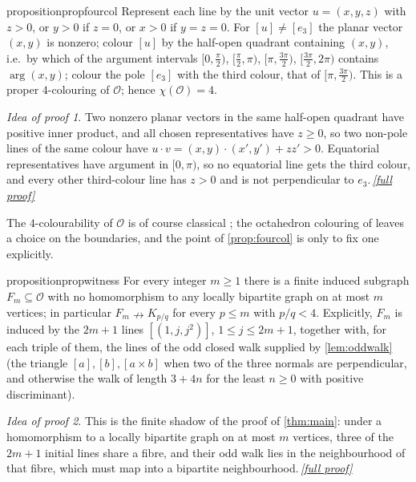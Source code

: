 \documentclass[11pt,a4paper]{article}
\theoremstyle{plain}
\theoremstyle{definition}
\theoremstyle{remark}
\newtheorem*{proofidea}{Idea of proof}
\newcommand{\fullproofref}[1]{\,\hyperref[#1]{\textit{[full proof]}}}
\newcommand{\cO}{\mathcal O}
\newcommand{\Kc}[2]{K_{#1/#2}}
\newcommand{\Fin}[1]{F_{#1}}
\begin{document}
\begin{restatable}{proposition}{propfourcol}\label{prop:fourcol}
Represent each line by the unit vector $u=(x,y,z)$ with $z>0$, or $y>0$ if $z=0$, or $x>0$ if $y=z=0$. For $[u]\ne[e_3]$ the planar vector $(x,y)$ is nonzero; colour $[u]$ by the half-open quadrant containing $(x,y)$, i.e.\ by which of the argument intervals $[0,\tfrac\pi2)$, $[\tfrac\pi2,\pi)$, $[\pi,\tfrac{3\pi}2)$, $[\tfrac{3\pi}2,2\pi)$ contains $\arg(x,y)$; colour the pole $[e_3]$ with the third colour, that of $[\pi,\tfrac{3\pi}2)$. This is a proper $4$-colouring of $\cO$; hence $\chi(\cO)=4$.
\end{restatable}
\begin{proofidea}
Two nonzero planar vectors in the same half-open quadrant have positive inner product, and all chosen representatives have $z\ge0$, so two non-pole lines of the same colour have $u\cdot v=(x,y)\cdot(x',y')+zz'>0$. Equatorial representatives have argument in $[0,\pi)$, so no equatorial line gets the third colour, and every other third-colour line has $z>0$ and is not perpendicular to $e_3$.\fullproofref{pf:fourcol}
\end{proofidea}
The $4$-colourability of $\cO$ is of course classical \cite{GZ88,Ghebleh07,OPG}; the octahedron colouring of \cite{OPG} leaves a choice on the boundaries, and the point of \cref{prop:fourcol} is only to fix one explicitly.

\begin{restatable}{proposition}{propwitness}\label{prop:witness}
For every integer $m\ge1$ there is a finite induced subgraph $\Fin m\subseteq\cO$ with no homomorphism to any locally bipartite graph on at most $m$ vertices; in particular $\Fin m\nrightarrow\Kc pq$ for every $p\le m$ with $p/q<4$. Explicitly, $\Fin m$ is induced by the $2m+1$ lines $[(1,j,j^2)]$, $1\le j\le 2m+1$, together with, for each triple of them, the lines of the odd closed walk supplied by \cref{lem:oddwalk} (the triangle $[a],[b],[a\times b]$ when two of the three normals are perpendicular, and otherwise the walk of length $3+4n$ for the least $n\ge0$ with positive discriminant).
\end{restatable}
\begin{proofidea}
This is the finite shadow of the proof of \cref{thm:main}: under a homomorphism to a locally bipartite graph on at most $m$ vertices, three of the $2m+1$ initial lines share a fibre, and their odd walk lies in the neighbourhood of that fibre, which must map into a bipartite neighbourhood.\fullproofref{pf:witness}
\end{proofidea}
\end{document}
